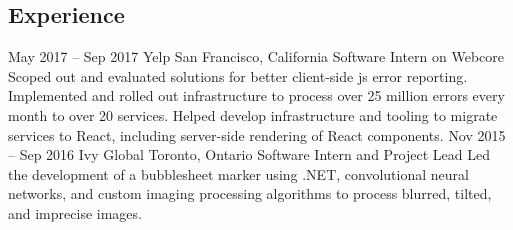\documentclass{resume}
\begin{document}
  \begin{main}
    \vspace{0.2cm}%
    \section{Experience}
      \begin{entrylist}
        \rightentry%
          {May 2017 -- Sep 2017}%
          {Yelp}%
          {San Francisco, California}%
          {Software Intern on Webcore}%
          {%
          {%
            Scoped out and evaluated solutions for better client-side js error reporting. %
          }%
          {%
            Implemented and rolled out infrastructure to process over  25 million errors every %
            month to over 20 services. %
          }%
          {%
            Helped develop infrastructure and tooling to migrate services to React, including %
            server-side rendering of React components. %
          }}
        \rightentry%
          {Nov 2015 -- Sep 2016}%
          {Ivy Global}%
          {Toronto, Ontario}%
          {Software Intern and Project Lead}%
          {%
          {%
            Led the development of a bubblesheet marker  using .NET, convolutional neural %
            networks, and custom imaging processing algorithms to process blurred, tilted, and %
            imprecise images. %
          }}
      \end{entrylist}

\end{main}
\end{document}
